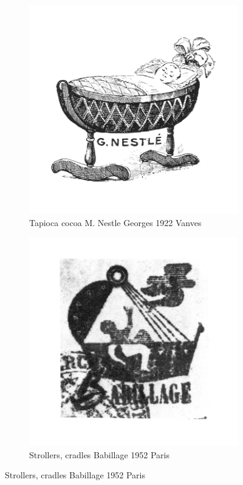 \begin{figure}[h]
  \begin{subfigure}{.45\textwidth}
    \centering
    \includegraphics[width=.5\linewidth]{images/supplement/trademarks/french/20_22}
    \caption[]{Tapioca cocoa M. Nestle Georges 1922 Vanves}
    \label{fig:trademarks:french:20.22}
  \end{subfigure}\hfill
  \begin{subfigure}{.45\textwidth}
    \centering
    \includegraphics[width=.5\linewidth]{images/supplement/trademarks/french/20_23}
    \caption[]{Strollers, cradles Babillage 1952 Paris}
    \label{fig:trademarks:french:20.23}
  \end{subfigure}


\end{figure}
